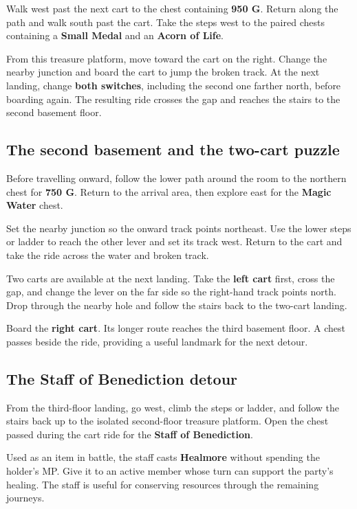 Walk west past the next cart to the chest containing
\textbf{950 G}. Return along the path and walk south past
the cart. Take the steps west to the paired chests containing
a \textbf{Small Medal} and an \textbf{Acorn of Life}.

From this treasure platform, move toward the cart on the right.
Change the nearby junction and board the cart to jump the broken
track. At the next landing, change \textbf{both switches},
including the second one farther north, before boarding again.
The resulting ride crosses the gap and reaches the stairs to
the second basement floor.

\subsection*{The second basement and the two-cart puzzle}

Before travelling onward, follow the lower path around the room
to the northern chest for \textbf{750 G}. Return to the
arrival area, then explore east for the \textbf{Magic Water}
chest.

Set the nearby junction so the onward track points northeast.
Use the lower steps or ladder to reach the other lever and set
its track west. Return to the cart and take the ride across
the water and broken track.

Two carts are available at the next landing. Take the
\textbf{left cart} first, cross the gap, and change the lever
on the far side so the right-hand track points north. Drop
through the nearby hole and follow the stairs back to the
two-cart landing.

Board the \textbf{right cart}. Its longer route reaches the
third basement floor. A chest passes beside the ride, providing
a useful landmark for the next detour.

\subsection*{The Staff of Benediction detour}

From the third-floor landing, go west, climb the steps or ladder,
and follow the stairs back up to the isolated second-floor
treasure platform. Open the chest passed during the cart ride
for the \textbf{Staff of Benediction}.

Used as an item in battle, the staff casts \textbf{Healmore}
without spending the holder's MP. Give it to an active member
whose turn can support the party's healing. The staff is useful
for conserving resources through the remaining journeys.

